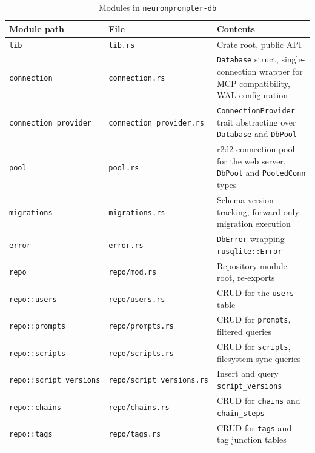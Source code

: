 \documentclass[a4paper, 11pt, oneside]{report}
\begin{document}
\begin{table}[H]
  \centering
  \caption{Modules in \texttt{neuronprompter-db}}
  \label{tab:mod-db}
  \begin{tabularx}{\textwidth}{l l X}
    \toprule
    \textbf{Module path} & \textbf{File} & \textbf{Contents} \\
    \midrule
    \texttt{lib}              & \texttt{lib.rs}          & Crate root, public API \\
    \texttt{connection}       & \texttt{connection.rs}   & \texttt{Database} struct, single-connection
                                                           wrapper for MCP compatibility, WAL configuration \\
    \texttt{connection\_provider} & \texttt{connection\_provider.rs} & \texttt{ConnectionProvider} trait
                                                           abstracting over \texttt{Database} and \texttt{DbPool} \\
    \texttt{pool}             & \texttt{pool.rs}         & r2d2 connection pool for the web server,
                                                           \texttt{DbPool} and \texttt{PooledConn} types \\
    \texttt{migrations}       & \texttt{migrations.rs}   & Schema version tracking, forward-only
                                                           migration execution \\
    \texttt{error}            & \texttt{error.rs}        & \texttt{DbError} wrapping \texttt{rusqlite::Error} \\
    \texttt{repo}             & \texttt{repo/mod.rs}     & Repository module root, re-exports \\
    \texttt{repo::users}      & \texttt{repo/users.rs}        & CRUD for the \texttt{users} table \\
    \texttt{repo::prompts}    & \texttt{repo/prompts.rs}      & CRUD for \texttt{prompts}, filtered queries \\
    \texttt{repo::scripts}    & \texttt{repo/scripts.rs}      & CRUD for \texttt{scripts}, filesystem sync queries \\
    \texttt{repo::script\_versions} & \texttt{repo/script\_versions.rs} & Insert and query \texttt{script\_versions} \\
    \texttt{repo::chains}     & \texttt{repo/chains.rs}       & CRUD for \texttt{chains} and \texttt{chain\_steps} \\
    \texttt{repo::tags}       & \texttt{repo/tags.rs}         & CRUD for \texttt{tags} and tag junction tables \\

\end{tabularx}
\end{table}
\end{document}
